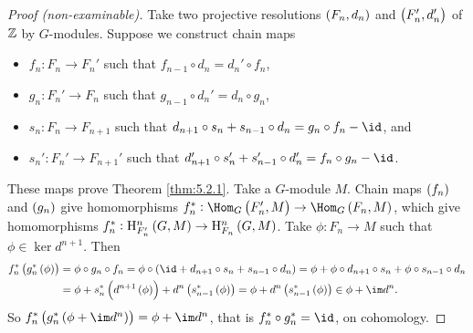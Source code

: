 \begin{proof}[Proof (non-examinable)]
Take two projective resolutions $ \br{F_n, d_n} $ and $ \br{F_n', d_n'} $ of $ \mathbb{Z} $ by $ G $-modules. Suppose we construct chain maps
\begin{itemize}
\item $ f_n : F_n \to F_n' $ such that $ f_{n - 1} \circ d_n = d_n' \circ f_n $,
\item $ g_n : F_n' \to F_n $ such that $ g_{n - 1} \circ d_n' = d_n \circ g_n $,
\item $ s_n : F_n \to F_{n + 1} $ such that $ d_{n + 1} \circ s_n + s_{n - 1} \circ d_n = g_n \circ f_n - \id $, and
\item $ s_n' : F_n' \to F_{n + 1}' $ such that $ d_{n + 1}' \circ s_n' + s_{n - 1}' \circ d_n' = f_n \circ g_n - \id $.
\end{itemize}
These maps prove Theorem \ref{thm:5.2.1}. Take a $ G $-module $ M $. Chain maps $ \br{f_n} $ and $ \br{g_n} $ give homomorphisms $ f_n^* : \Hom_G\br{F_n', M} \to \Hom_G\br{F_n, M} $, which give homomorphisms $ f_n^* : \H_{F_n'}^n\br{G, M} \to \H_{F_n}^n\br{G, M} $. Take $ \phi : F_n \to M $ such that $ \phi \in \ker d^{n + 1} $. Then
\begin{align*}
f_n^*\br{g_n^*\br{\phi}}
& = \phi \circ g_n \circ f_n
= \phi \circ \br{\id + d_{n + 1} \circ s_n + s_{n - 1} \circ d_n}
= \phi + \phi \circ d_{n + 1} \circ s_n + \phi \circ s_{n - 1} \circ d_n \\
& = \phi + s_n^*\br{d^{n + 1}\br{\phi}} + d^n\br{s_{n - 1}^*\br{\phi}}
= \phi + d^n\br{s_{n - 1}^*\br{\phi}}
\in \phi + \im d^n.
\end{align*}
So $ f_n^*\br{g_n^*\br{\phi + \im d^n}} = \phi + \im d^n $, that is $ f_n^* \circ g_n^* = \id $, on cohomology.

\pagebreak


\end{proof}
